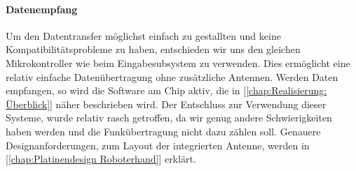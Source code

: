 \documentclass[titlepage,12pt,twoside]{article}
\begin{document}
\paragraph{Datenempfang}
\hfill \break
\hfill \break
Um den Datentransfer möglichst einfach zu gestallten und keine Kompatibilitätsprobleme zu haben, entschieden wir uns den gleichen Mikrokontroller
wie beim Eingabesubsystem zu verwenden. Dies ermöglicht eine relativ einfache Datenübertragung ohne zusätzliche Antennen. Werden Daten empfangen,
so wird die Software am Chip aktiv, die in [\textcolor{blue}{\autoref{chap:Realisierung: Überblick}}] näher beschrieben wird. Der
Entschluss zur Verwendung dieser  Systeme, wurde relativ rasch getroffen, da wir genug andere Schwierigkeiten haben werden und 
die Funkübertragung nicht dazu zählen soll. Genauere Designanforderungen, zum Layout der integrierten Antenne, werden in [\textcolor{blue}{\autoref{chap:Platinendesign Roboterhand}}] erklärt.
\newpage
\end{document}

